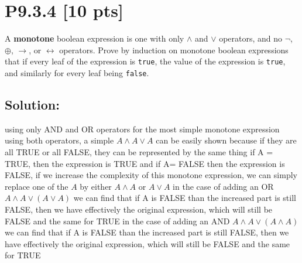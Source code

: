 \documentclass[12pt]{article}
\begin{document}
\newpage
\section*{\textbf{P9.3.4} [10 pts]}
 A \textbf{monotone} boolean expression is one with only $\land$ and $\lor$ operators, and no $\lnot$, $\oplus$, $\rightarrow$, or $\leftrightarrow$ operators. Prove by induction on monotone boolean expressions that if every leaf of the expression is \texttt{true}, the value of the expression is \texttt{true}, and similarly for every leaf being \texttt{false}.

\subsection*{\textbf{Solution:}}
using only AND and OR operators\newline
for the most simple monotone expression using both operators, a simple $A\land A \lor A$ can be easily shown because if they are all TRUE or all FALSE, they can be represented by the same thing
\newline if A = TRUE, then the expression is TRUE and if A= FALSE then the expression is FALSE, if we increase the complexity of this monotone expression, we can simply replace one of the $A$ by either $A\land A$ or $A\lor A$
\newline in the case of adding an OR $A\land A \lor (A\lor A)$ we can find that if A is FALSE than the increased part is still FALSE, then we have effectively the original expression, which will still be FALSE and the same for TRUE
\newline in the case of adding an AND $A\land A \lor (A\land A)$ we can find that if A is FALSE than the increased part is still FALSE, then we have effectively the original expression, which will still be FALSE and the same for TRUE


\newpage
\end{document}
